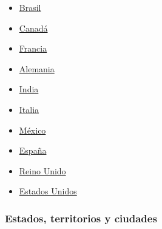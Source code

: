 \begin{itemize}
\tightlist
\item
  \href{https://www.nytimes3xbfgragh.onion/interactive/2020/world/americas/brazil-coronavirus-cases.html}{Brasil}
\item
  \href{https://www.nytimes3xbfgragh.onion/interactive/2020/world/canada/canada-coronavirus-cases.html}{Canadá}
\item
  \href{https://www.nytimes3xbfgragh.onion/interactive/2020/world/europe/france-coronavirus-cases.html}{Francia}
\item
  \href{https://www.nytimes3xbfgragh.onion/interactive/2020/world/europe/germany-coronavirus-cases.html}{Alemania}
\item
  \href{https://www.nytimes3xbfgragh.onion/interactive/2020/world/asia/india-coronavirus-cases.html}{India}
\item
  \href{https://www.nytimes3xbfgragh.onion/interactive/2020/world/europe/italy-coronavirus-cases.html}{Italia}
\item
  \href{https://www.nytimes3xbfgragh.onion/es/interactive/2020/espanol/america-latina/coronavirus-en-mexico.html}{México}
\item
  \href{https://www.nytimes3xbfgragh.onion/interactive/2020/world/europe/spain-coronavirus-cases.html}{España}
\item
  \href{https://www.nytimes3xbfgragh.onion/interactive/2020/world/europe/united-kingdom-coronavirus-cases.html}{Reino
  Unido}
\item
  \href{https://www.nytimes3xbfgragh.onion/es/interactive/2020/espanol/mundo/coronavirus-en-estados-unidos.html}{Estados
  Unidos}
\end{itemize}

\hypertarget{estados-territorios-y-ciudades}{%
\subsubsection{Estados, territorios y
ciudades}\label{estados-territorios-y-ciudades}}

